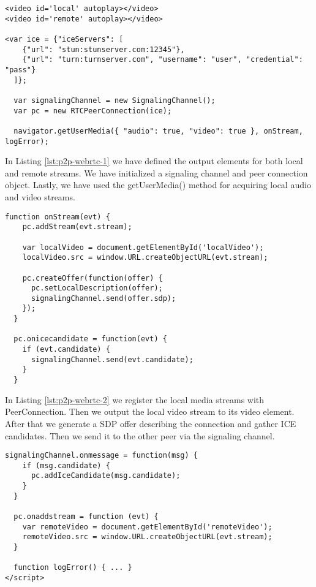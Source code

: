 \begin{lstlisting}[caption={Initializing a WebRTC P2P connection, Part I}, label={lst:p2p-webrtc-1}]
<video id='local' autoplay></video>
<video id='remote' autoplay></video>

<var ice = {"iceServers": [
    {"url": "stun:stunserver.com:12345"},
    {"url": "turn:turnserver.com", "username": "user", "credential": "pass"}
  ]};

  var signalingChannel = new SignalingChannel();
  var pc = new RTCPeerConnection(ice);

  navigator.getUserMedia({ "audio": true, "video": true }, onStream, logError);
\end{lstlisting}

In Listing \ref{lst:p2p-webrtc-1} we have defined the output elements for both local and remote streams. We have initialized a signaling channel and peer connection object. Lastly, we have used the getUserMedia() method for acquiring local audio and video streams.

\begin{lstlisting}[caption={Initializing a WebRTC P2P connection, Part II}, label={lst:p2p-webrtc-2}]
  function onStream(evt) {
    pc.addStream(evt.stream);

    var localVideo = document.getElementById('localVideo');
    localVideo.src = window.URL.createObjectURL(evt.stream);

    pc.createOffer(function(offer) {
      pc.setLocalDescription(offer);
      signalingChannel.send(offer.sdp);
    });
  }

  pc.onicecandidate = function(evt) {
    if (evt.candidate) {
      signalingChannel.send(evt.candidate);
    }
  }
\end{lstlisting}

In Listing \ref{lst:p2p-webrtc-2} we register the local media streams with PeerConnection. Then we output the local video stream to its video element. After that we generate a SDP offer describing the connection and gather ICE candidates. Then we send it to the other peer via the signaling channel.

\begin{lstlisting}[caption={Initializing a WebRTC P2P connection, Part III}, label={lst:p2p-webrtc-3}]
  signalingChannel.onmessage = function(msg) {
    if (msg.candidate) {
      pc.addIceCandidate(msg.candidate);
    }
  }

  pc.onaddstream = function (evt) {
    var remoteVideo = document.getElementById('remoteVideo');
    remoteVideo.src = window.URL.createObjectURL(evt.stream);
  }

  function logError() { ... }
</script>
\end{lstlisting}


